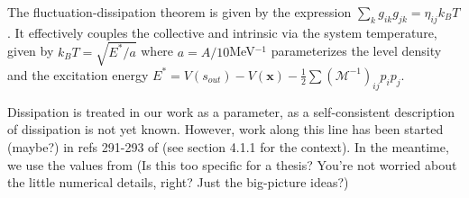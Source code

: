 The fluctuation-dissipation theorem is given by the expression $\sum_k g_{ik}g_{jk} = \eta_{ij}k_BT$. It effectively couples the collective and intrinsic via the system temperature, given by $k_BT = \sqrt{E^*/a}$ where $a=A/10$MeV$^{-1}$ parameterizes the level density and the excitation energy $E^* = V(s_{out}) - V(\mathbf{x}) - \frac{1}{2}\sum\left(\mathcal{M}^{-1}\right)_{ij}p_i p_j$.

Dissipation is treated in our work as a parameter, as a self-consistent description of dissipation is not yet known. However, work along this line has been started (maybe?) in refs 291-293 of \cite{Schmidt2018} (see section 4.1.1 for the context). In the meantime, we use the values from \cite{Sadhukhan2016} (Is this too specific for a thesis? You're not worried about the little numerical details, right? Just the big-picture ideas?)

